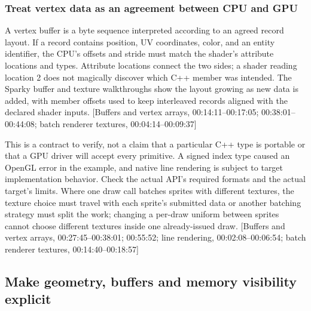 \subsubsection{Treat vertex data as an agreement between CPU and GPU}\label{06-engine-ii-ch025-treat-vertex-data-as-an-agreement-between-cpu-and-gpu}

A vertex buffer is a byte sequence interpreted according to an agreed record layout. If a record contains position, UV coordinates, color, and an entity identifier, the CPU's offsets and stride must match the shader's attribute locations and types. Attribute locations connect the two sides; a shader reading location 2 does not magically discover which C++ member was intended. The Sparky buffer and texture walkthroughs show the layout growing as new data is added, with member offsets used to keep interleaved records aligned with the declared shader inputs. {[}Buffers and vertex arrays, 00:14:11--00:17:05; 00:38:01--00:44:08; batch renderer textures, 00:04:14--00:09:37{]}

This is a contract to verify, not a claim that a particular C++ type is portable or that a GPU driver will accept every primitive. A signed index type caused an OpenGL error in the example, and native line rendering is subject to target implementation behavior. Check the actual API's required formats and the actual target's limits. Where one draw call batches sprites with different textures, the texture choice must travel with each sprite's submitted data or another batching strategy must split the work; changing a per-draw uniform between sprites cannot choose different textures inside one already-issued draw. {[}Buffers and vertex arrays, 00:27:45--00:38:01; 00:55:52; line rendering, 00:02:08--00:06:54; batch renderer textures, 00:14:40--00:18:57{]}

\subsection{Make geometry, buffers and memory visibility explicit}\label{06-engine-ii-ch025-make-geometry-buffers-and-memory-visibility-explicit}


